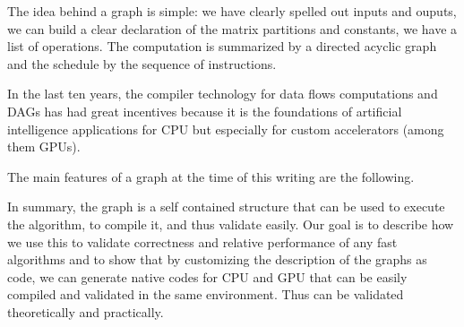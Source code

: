 \documentclass[acmsmall]{acmart}
\begin{document}
The idea behind a graph is simple: we have clearly spelled out inputs
and ouputs, we can build a clear declaration of the matrix partitions
and constants, we have a list of operations. The computation is
summarized by a directed acyclic graph and the schedule by the
sequence of instructions.

In the last ten years, the compiler technology for data flows
computations and DAGs has had great incentives because it is the
foundations of artificial intelligence applications for CPU but
especially for custom accelerators (among them GPUs).

The main features of a graph at the time of this writing are the
following.

In summary, the graph is a self contained structure that can be used
to execute the algorithm, to compile it, and thus validate easily. Our
goal is to describe how we use this to validate correctness and
relative performance of any fast algorithms and to show that by
customizing the description of the graphs as code, we can generate
native codes for CPU and GPU that can be easily compiled and validated
in the same environment.  Thus can be validated theoretically and
practically.
\end{document}
